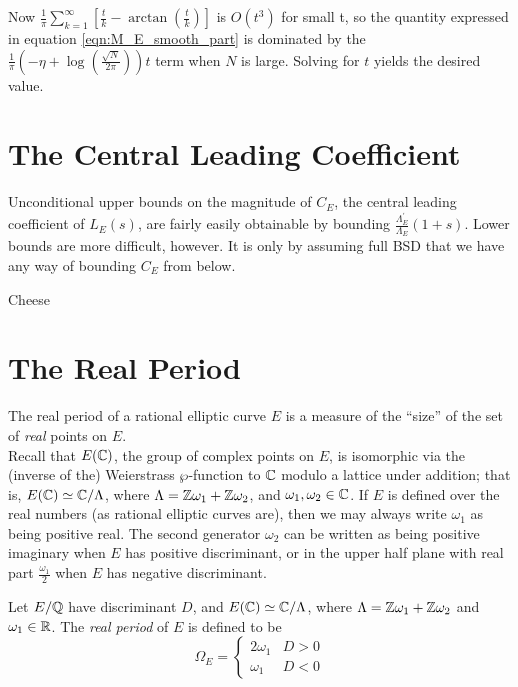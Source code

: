 \documentclass[10pt]{article}
\newcommand{\pr}{^{\prime}}
\newcommand{\Les}{L_E(s)}
\newcommand{\ldLam}[1]{\frac{\Lambda_E\pr}{\Lambda_E}\left(#1\right)}
\begin{document}
Now $\frac{1}{\pi}\sum_{k=1}^{\infty} \left[\frac{t}{k} - \arctan\left(\frac{t}{k}\right)\right]$ is $O(t^3)$ for small t, so the quantity expressed in equation \ref{eqn:M_E_smooth_part} is dominated by the $\frac{1}{\pi}\left(-\eta+\log\left(\frac{\sqrt{N}}{2\pi}\right)\right) t$ term when $N$ is large. Solving for $t$ yields the desired value.

\newpage
\section{The Central Leading Coefficient}

Unconditional upper bounds on the magnitude of $C_E$, the central leading coefficient of $\Les$, are fairly easily obtainable by bounding $\ldLam{1+s}$. Lower bounds are more difficult, however. It is only by assuming full BSD that we have any way of bounding $C_E$ from below.

\begin{proposition}
Cheese
\end{proposition}

\newpage
\section{The Real Period}

The real period of a rational elliptic curve $E$ is a measure of the ``size'' of the set of {\it real} points on $E$. \\

Recall that $E(\mathbb{C})$, the group of complex points on $E$, is isomorphic via the (inverse of the) Weierstrass $\wp$-function to $\mathbb{C}$ modulo a lattice under addition; that is, $E(\mathbb{C}) \simeq \mathbb{C}/\Lambda$, where $\Lambda = \mathbb{Z}\omega_1 + \mathbb{Z}\omega_2$, and $\omega_1,\omega_2 \in \mathbb{C}$.
If $E$ is defined over the real numbers (as rational elliptic curves are), then we may always write $\omega_1$ as being positive real. The second generator $\omega_2$ can be written as being positive imaginary when $E$ has positive discriminant, or in the upper half plane with real part $\frac{\omega_1}{2}$ when $E$ has negative discriminant.

\begin{definition}
Let $E/\mathbb{Q}$ have discriminant $D$, and $E(\mathbb{C}) \simeq \mathbb{C}/\Lambda$, where $\Lambda = \mathbb{Z}\omega_1 + \mathbb{Z}\omega_2$ and $\omega_1 \in \mathbb{R}$. The {\it real period} of $E$ is defined to be
\begin{equation}
\Omega_E = \begin{cases} 2\omega_1 & D > 0 \\ \omega_1 & D < 0 \end{cases}
\end{equation}
\end{definition}
\end{document}
